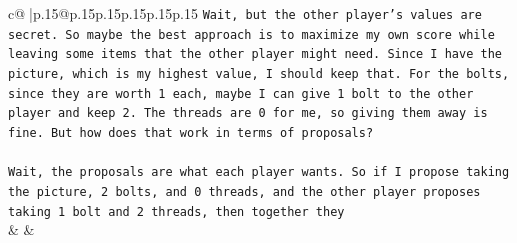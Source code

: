 \documentclass{article}
\begin{document}
{\begin{supertabular}{c@{$\;$}|p{.15\linewidth}@{}p{.15\linewidth}p{.15\linewidth}p{.15\linewidth}p{.15\linewidth}p{.15\linewidth}}
{{{\texttt{Wait, but the other player's values are secret. So maybe the best approach is to maximize my own score while leaving some items that the other player might need. Since I have the picture, which is my highest value, I should keep that. For the bolts, since they are worth 1 each, maybe I can give 1 bolt to the other player and keep 2. The threads are 0 for me, so giving them away is fine. But how does that work in terms of proposals?} \\
\\ 
\texttt{Wait, the proposals are what each player wants. So if I propose taking the picture, 2 bolts, and 0 threads, and the other player proposes taking 1 bolt and 2 threads, then together they} \\
            }
        }
    }
    & & \\ \\


\end{supertabular}}
\end{document}
